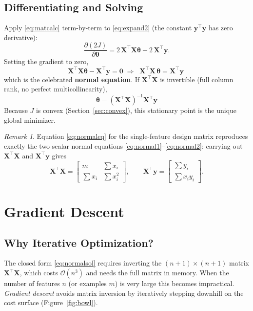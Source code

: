\documentclass[11pt,a4paper]{report}
\theoremstyle{definition}
\theoremstyle{plain}
\theoremstyle{remark}
\newtheorem*{remark}{Remark}
\newcommand{\vy}{\mathbf{y}}
\newcommand{\vw}{\bm{\theta}}          %
\newcommand{\Xmat}{\mathbf{X}}
\newcommand{\normeq}{\Xmat^{\!\top}\Xmat\,\vw = \Xmat^{\!\top}\vy}
\begin{document}
	\section{Differentiating and Solving}
	Apply \eqref{eq:matcalc} term-by-term to \eqref{eq:expand2} (the constant
	$\vy^{\!\top}\vy$ has zero derivative):
	\begin{equation}
		\frac{\partial (2J)}{\partial\vw}
		=2\,\Xmat^{\!\top}\Xmat\vw-2\,\Xmat^{\!\top}\vy .
	\end{equation}
	Setting the gradient to zero,
	\begin{equation}
		\Xmat^{\!\top}\Xmat\vw-\Xmat^{\!\top}\vy=\mathbf{0}
		\;\Longrightarrow\;
		\boxed{\;\normeq\;}
		\label{eq:normaleq}
	\end{equation}
	which is the celebrated \textbf{normal equation}. If $\Xmat^{\!\top}\Xmat$ is
	invertible (full column rank, no perfect multicollinearity),
	\begin{equation}
		\boxed{\;\vw=(\Xmat^{\!\top}\Xmat)^{-1}\Xmat^{\!\top}\vy\;}
		\label{eq:normalsol}
	\end{equation}
	Because $J$ is convex (Section~\ref{sec:convex}), this stationary point is the
	unique global minimizer.
	
	\begin{remark}
		Equation \eqref{eq:normaleq} for the single-feature design matrix reproduces
		exactly the two scalar normal equations \eqref{eq:normal1}--\eqref{eq:normal2}:
		carrying out $\Xmat^{\!\top}\Xmat$ and $\Xmat^{\!\top}\vy$ gives
		\[
		\Xmat^{\!\top}\Xmat=\begin{bmatrix}m&\sum x_i\\[2pt]\sum x_i&\sum x_i^2\end{bmatrix},
		\qquad
		\Xmat^{\!\top}\vy=\begin{bmatrix}\sum y_i\\[2pt]\sum x_i y_i\end{bmatrix}.
		\]
	\end{remark}
	
	\chapter{Gradient Descent}
	
	\section{Why Iterative Optimization?}
	The closed form \eqref{eq:normalsol} requires inverting the
	$(n+1)\times(n+1)$ matrix $\Xmat^{\!\top}\Xmat$, which costs
	$\mathcal{O}(n^3)$ and needs the full matrix in memory. When the number of
	features $n$ (or examples $m$) is very large this becomes impractical.
	\emph{Gradient descent} avoids matrix inversion by iteratively stepping
	downhill on the cost surface (Figure~\ref{fig:bowl}).
	
\end{document}
